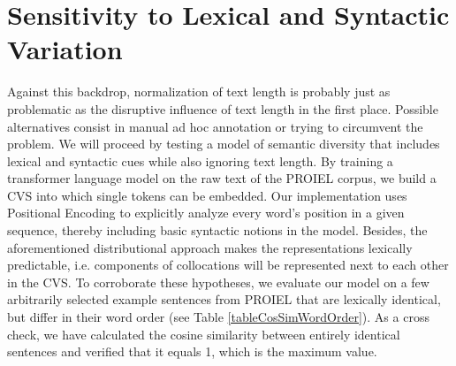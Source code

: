 \section{Sensitivity to Lexical and Syntactic Variation}
Against this backdrop, normalization of text length is probably just as problematic as the disruptive influence of text length in the first place. Possible alternatives consist in manual ad hoc annotation or trying to circumvent the problem. We will proceed by testing a model of semantic diversity that includes lexical and syntactic cues while also ignoring text length. By training a transformer language model \parencite[9]{vaswaniAttentionAllYou2017} on the raw text of the PROIEL corpus, we build a \gls{CVS} into which single tokens can be embedded. Our implementation uses Positional Encoding \parencite[4]{conneauCrosslingualLanguageModel2019} to explicitly analyze every word's position in a given sequence, thereby including basic syntactic notions in the model. Besides, the aforementioned distributional approach makes the representations lexically predictable, i.e. components of collocations will be represented next to each other in the \gls{CVS}. To corroborate these hypotheses, we evaluate our model on a few arbitrarily selected example sentences from PROIEL that are lexically identical, but differ in their word order (see Table \ref{tableCosSimWordOrder}). As a cross check, we have calculated the cosine similarity between entirely identical sentences and verified that it equals 1, which is the maximum value.
